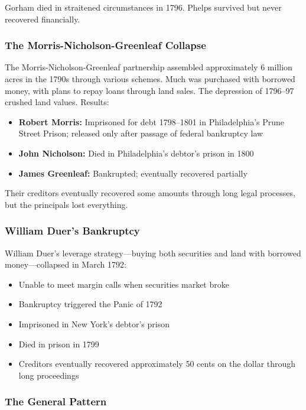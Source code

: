 \documentclass[12pt]{article}
\begin{document}
Gorham died in straitened circumstances in 1796. Phelps survived but never recovered financially.

\subsubsection{The Morris-Nicholson-Greenleaf Collapse}

The Morris-Nicholson-Greenleaf partnership assembled approximately 6 million acres in the 1790s through various schemes. Much was purchased with borrowed money, with plans to repay loans through land sales. The depression of 1796--97 crushed land values. Results:

\begin{itemize}
\item \textbf{Robert Morris:} Imprisoned for debt 1798--1801 in Philadelphia's Prune Street Prison; released only after passage of federal bankruptcy law
\item \textbf{John Nicholson:} Died in Philadelphia's debtor's prison in 1800
\item \textbf{James Greenleaf:} Bankrupted; eventually recovered partially
\end{itemize}

Their creditors eventually recovered some amounts through long legal processes, but the principals lost everything.

\subsubsection{William Duer's Bankruptcy}

William Duer's leverage strategy---buying both securities and land with borrowed money---collapsed in March 1792:

\begin{itemize}
\item Unable to meet margin calls when securities market broke
\item Bankruptcy triggered the Panic of 1792
\item Imprisoned in New York's debtor's prison
\item Died in prison in 1799
\item Creditors eventually recovered approximately 50 cents on the dollar through long proceedings
\end{itemize}

\subsubsection{The General Pattern}
\end{document}

